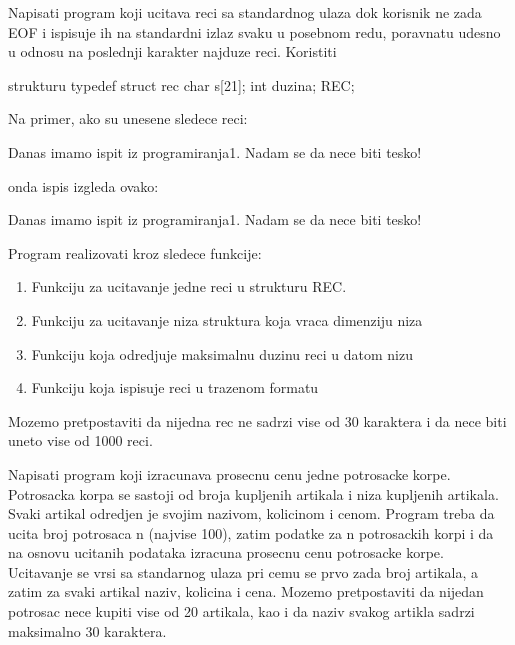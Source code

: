 \begin{Exercise}[label=v2.5_03] 

Napisati program koji ucitava reci sa standardnog ulaza dok korisnik ne zada EOF i ispisuje
ih na standardni izlaz svaku u posebnom redu, poravnatu udesno u odnosu 
na poslednji karakter najduze reci. Koristiti
\begin{ckod}
strukturu typedef struct rec
	  {
	     char s[21];
	     int duzina;
          }REC;
\end{ckod}
Na primer, ako su unesene sledece reci:
\begin{ckod}
Danas imamo ispit iz programiranja1.
Nadam se da nece biti tesko!
\end{ckod}
onda ispis izgleda ovako:
\begin{ckod}
          Danas 
          imamo 
          ispit 
             iz 
programiranja1.
          Nadam 
             se 
             da 
           nece 
           biti 
         tesko!
\end{ckod}

Program realizovati kroz sledece funkcije:
\begin{enumerate}
\item Funkciju za ucitavanje jedne reci u strukturu REC.
\item Funkciju za ucitavanje niza struktura koja vraca dimenziju niza
\item Funkciju koja odredjuje maksimalnu duzinu reci u datom nizu
\item Funkciju koja ispisuje reci u trazenom formatu
\end{enumerate}

Mozemo pretpostaviti da nijedna rec ne sadrzi vise od 30 karaktera i da nece biti
uneto vise od 1000 reci.

\end{Exercise}
\begin{Answer}[ref=v2.5_03]
\end{Answer}

\begin{Exercise}[label=v2.5_04] 
   Napisati program koji izracunava prosecnu cenu jedne potrosacke
   korpe. Potrosacka korpa se sastoji od broja kupljenih artikala i 
   niza kupljenih artikala. Svaki artikal odredjen je svojim nazivom, 
   kolicinom i cenom. Program treba da ucita broj potrosaca n (najvise 100), 
   zatim podatke za n potrosackih korpi i da na osnovu ucitanih podataka 
   izracuna prosecnu cenu potrosacke korpe. Ucitavanje se vrsi sa standarnog
   ulaza pri cemu se prvo zada broj artikala, a zatim za svaki artikal naziv, 
   kolicina i cena.  Mozemo pretpostaviti da nijedan 
   potrosac nece kupiti vise od 20 artikala, kao i da naziv svakog artikla
   sadrzi maksimalno 30 karaktera.
\end{Exercise}
\begin{Answer}[ref=v2.5_04]
\end{Answer}

